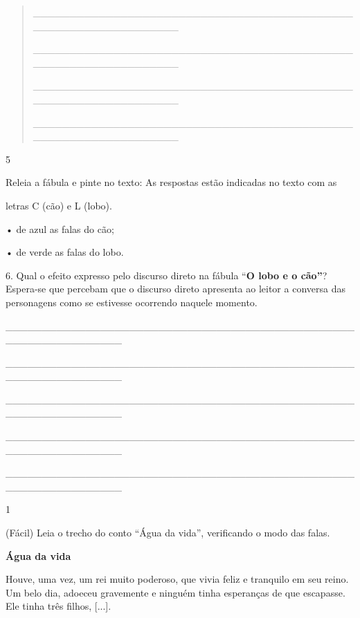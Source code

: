 \begin{itemize}
{{{\begin{itemize}
\begin{itemize}
\begin{itemize}
\begin{quote}
\_\_\_\_\_\_\_\_\_\_\_\_\_\_\_\_\_\_\_\_\_\_\_\_\_\_\_\_\_\_\_\_\_\_\_\_\_\_\_\_\_\_\_\_\_\_\_\_\_\_\_\_\_\_\_\_\_\_\_\_\_\_\_\_

\_\_\_\_\_\_\_\_\_\_\_\_\_\_\_\_\_\_\_\_\_\_\_\_\_\_\_\_\_\_\_\_\_\_\_\_\_\_\_\_\_\_\_\_\_\_\_\_\_\_\_\_\_\_\_\_\_\_\_\_\_\_\_\_

\_\_\_\_\_\_\_\_\_\_\_\_\_\_\_\_\_\_\_\_\_\_\_\_\_\_\_\_\_\_\_\_\_\_\_\_\_\_\_\_\_\_\_\_\_\_\_\_\_\_\_\_\_\_\_\_\_\_\_\_\_\_\_\_

\_\_\_\_\_\_\_\_\_\_\_\_\_\_\_\_\_\_\_\_\_\_\_\_\_\_\_\_\_\_\_\_\_\_\_\_\_\_\_\_\_\_\_\_\_\_\_\_\_\_\_\_\_\_\_\_\_\_\_\_\_\_\_\_
\end{quote}

\num{5}

Releia a fábula e pinte no texto: As respostas estão indicadas no texto
com as

letras C (cão) e L (lobo).

• de azul as falas do cão;

• de verde as falas do lobo.

6. Qual o efeito expresso pelo discurso direto na fábula ``\textbf{O
lobo e o cão''}? Espera-se que percebam que o discurso direto apresenta
ao leitor a conversa das personagens como se estivesse ocorrendo naquele
momento.

\_\_\_\_\_\_\_\_\_\_\_\_\_\_\_\_\_\_\_\_\_\_\_\_\_\_\_\_\_\_\_\_\_\_\_\_\_\_\_\_\_\_\_\_\_\_\_\_\_\_\_\_\_\_\_\_\_\_\_\_\_\_\_\_

\_\_\_\_\_\_\_\_\_\_\_\_\_\_\_\_\_\_\_\_\_\_\_\_\_\_\_\_\_\_\_\_\_\_\_\_\_\_\_\_\_\_\_\_\_\_\_\_\_\_\_\_\_\_\_\_\_\_\_\_\_\_\_\_

\_\_\_\_\_\_\_\_\_\_\_\_\_\_\_\_\_\_\_\_\_\_\_\_\_\_\_\_\_\_\_\_\_\_\_\_\_\_\_\_\_\_\_\_\_\_\_\_\_\_\_\_\_\_\_\_\_\_\_\_\_\_\_\_

\_\_\_\_\_\_\_\_\_\_\_\_\_\_\_\_\_\_\_\_\_\_\_\_\_\_\_\_\_\_\_\_\_\_\_\_\_\_\_\_\_\_\_\_\_\_\_\_\_\_\_\_\_\_\_\_\_\_\_\_\_\_\_\_

\_\_\_\_\_\_\_\_\_\_\_\_\_\_\_\_\_\_\_\_\_\_\_\_\_\_\_\_\_\_\_\_\_\_\_\_\_\_\_\_\_\_\_\_\_\_\_\_\_\_\_\_\_\_\_\_\_\_\_\_\_\_\_\_


\num{1}

(Fácil) Leia o trecho do conto ``Água da vida'', verificando o modo das
falas.

\textbf{Água da vida}

Houve, uma vez, um rei muito poderoso, que vivia feliz e tranquilo em
seu reino. Um belo dia, adoeceu gravemente e ninguém tinha esperanças de
que escapasse. Ele tinha três filhos, {[}...{]}.


\end{itemize}
\end{itemize}
\end{itemize}}}}
\end{itemize}
